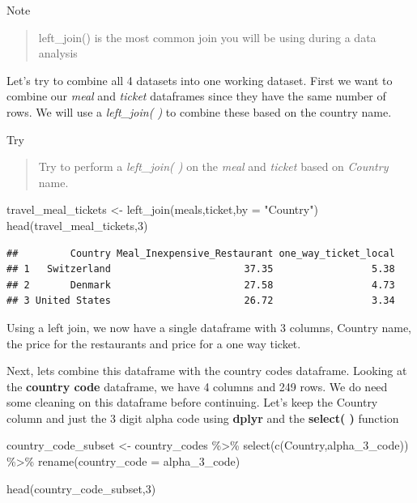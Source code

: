 \documentclass[
]{book}
\newenvironment{Shaded}{\begin{snugshade}}{\end{snugshade}}
\newcommand{\AttributeTok}[1]{\textcolor[rgb]{0.77,0.63,0.00}{#1}}
\newcommand{\DecValTok}[1]{\textcolor[rgb]{0.00,0.00,0.81}{#1}}
\newcommand{\FunctionTok}[1]{\textcolor[rgb]{0.00,0.00,0.00}{#1}}
\newcommand{\NormalTok}[1]{#1}
\newcommand{\OtherTok}[1]{\textcolor[rgb]{0.56,0.35,0.01}{#1}}
\newcommand{\SpecialCharTok}[1]{\textcolor[rgb]{0.00,0.00,0.00}{#1}}
\newcommand{\StringTok}[1]{\textcolor[rgb]{0.31,0.60,0.02}{#1}}
\begin{document}
Note

\begin{quote}
left\_join() is the most common join you will be using during a data analysis
\end{quote}

Let's try to combine all 4 datasets into one working dataset. First we want to combine our \emph{meal} and \emph{ticket} dataframes since they have the same number of rows. We will use a \emph{left\_join( )} to combine these based on the country name.

Try

\begin{quote}
Try to perform a \emph{left\_join( )} on the \emph{meal} and \emph{ticket} based on \emph{Country} name.
\end{quote}

\begin{Shaded}
\begin{Highlighting}[]
\NormalTok{travel\_meal\_tickets }\OtherTok{\textless{}{-}} \FunctionTok{left\_join}\NormalTok{(meals,ticket,}\AttributeTok{by =} \StringTok{"Country"}\NormalTok{)}
\FunctionTok{head}\NormalTok{(travel\_meal\_tickets,}\DecValTok{3}\NormalTok{)}
\end{Highlighting}
\end{Shaded}

\begin{verbatim}
##         Country Meal_Inexpensive_Restaurant one_way_ticket_local
## 1   Switzerland                       37.35                 5.38
## 2       Denmark                       27.58                 4.73
## 3 United States                       26.72                 3.34
\end{verbatim}

Using a left join, we now have a single dataframe with 3 columns, Country name, the price for the restaurants and price for a one way ticket.

Next, lets combine this dataframe with the country codes dataframe. Looking at the \textbf{country code} dataframe, we have 4 columns and 249 rows. We do need some cleaning on this dataframe before continuing. Let's keep the Country column and just the 3 digit alpha code using \textbf{dplyr} and the \textbf{select( )} function

\begin{Shaded}
\begin{Highlighting}[]
\NormalTok{country\_code\_subset }\OtherTok{\textless{}{-}}\NormalTok{ country\_codes }\SpecialCharTok{\%\textgreater{}\%}
  \FunctionTok{select}\NormalTok{(}\FunctionTok{c}\NormalTok{(Country,alpha\_3\_code)) }\SpecialCharTok{\%\textgreater{}\%}
  \FunctionTok{rename}\NormalTok{(}\AttributeTok{country\_code =}\NormalTok{ alpha\_3\_code)}

\FunctionTok{head}\NormalTok{(country\_code\_subset,}\DecValTok{3}\NormalTok{)}
\end{Highlighting}
\end{Shaded}
\end{document}
